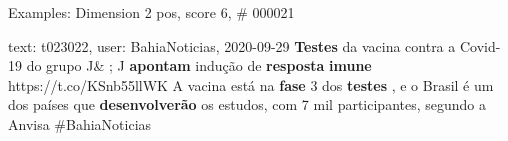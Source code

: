 \begin{frame}{Examples: Dimension 2 pos, score 6, \# 000021}
\footnotesize
\begin{exampleblock}{text: t023022, user: BahiaNoticias, 2020-09-29}
\textbf{Testes} da vacina contra a Covid-19 do grupo J\& ; J \textbf{apontam} 
indução de \textbf{resposta} \textbf{imune} https://t.co/KSnb55llWK A vacina 
está na \textbf{fase} 3 dos \textbf{testes} , e o Brasil é um dos países que 
\textbf{desenvolverão} os estudos, com 7 mil participantes, segundo a Anvisa 
\#BahiaNoticias 
\end{exampleblock}
\end{frame}

